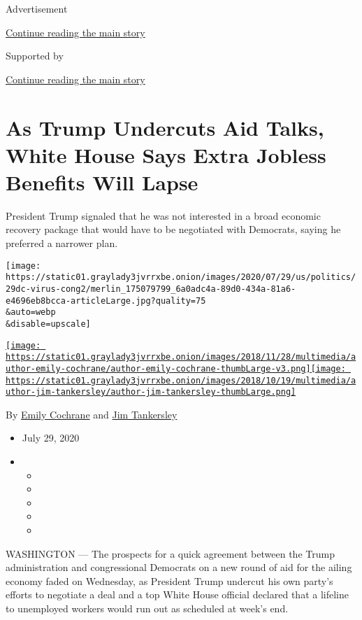 Advertisement

\protect\hyperlink{after-top}{Continue reading the main story}

Supported by

\protect\hyperlink{after-sponsor}{Continue reading the main story}

\hypertarget{as-trump-undercuts-aid-talks-white-house-says-extra-jobless-benefits-will-lapse}{%
\section{As Trump Undercuts Aid Talks, White House Says Extra Jobless
Benefits Will
Lapse}\label{as-trump-undercuts-aid-talks-white-house-says-extra-jobless-benefits-will-lapse}}

President Trump signaled that he was not interested in a broad economic
recovery package that would have to be negotiated with Democrats, saying
he preferred a narrower plan.

\texttt{[image: https://static01.graylady3jvrrxbe.onion/images/2020/07/29/us/politics/29dc-virus-cong2/merlin\_175079799\_6a0adc4a-89d0-434a-81a6-e4696eb8bcca-articleLarge.jpg?quality=75\\\&auto=webp\\\&disable=upscale]}

\href{https://www.nytimes3xbfgragh.onion/by/emily-cochrane}{\texttt{[image: https://static01.graylady3jvrrxbe.onion/images/2018/11/28/multimedia/author-emily-cochrane/author-emily-cochrane-thumbLarge-v3.png]}}\href{https://www.nytimes3xbfgragh.onion/by/jim-tankersley}{\texttt{[image: https://static01.graylady3jvrrxbe.onion/images/2018/10/19/multimedia/author-jim-tankersley/author-jim-tankersley-thumbLarge.png]}}

By \href{https://www.nytimes3xbfgragh.onion/by/emily-cochrane}{Emily
Cochrane} and
\href{https://www.nytimes3xbfgragh.onion/by/jim-tankersley}{Jim
Tankersley}

\begin{itemize}
\item
  July 29, 2020
\item
  \begin{itemize}
  \item
  \item
  \item
  \item
  \item
  \end{itemize}
\end{itemize}

WASHINGTON --- The prospects for a quick agreement between the Trump
administration and congressional Democrats on a new round of aid for the
ailing economy faded on Wednesday, as President Trump undercut his own
party's efforts to negotiate a deal and a top White House official
declared that a lifeline to unemployed workers would run out as
scheduled at week's end.

